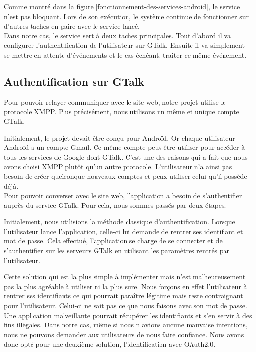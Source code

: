 Comme montré dans la figure \ref{fonctionnement-des-services-android}, le service n'est pas  bloquant. 
Lors de son exécution, le système continue de fonctionner sur d'autres taches en paire avec le service lancé.
\\

Dans notre cas, le service sert à deux taches principales. Tout d'abord il va configurer l'authentification
de l'utilisateur sur GTalk. Ensuite il va simplement se mettre en attente d'événements et le cas échéant, 
traiter ce même événement.
\\



\subsection{Authentification sur GTalk}

Pour pouvoir relayer communiquer avec le site web, notre projet utilise le protocole XMPP. Plus 
précisément, nous utilisons un même et unique compte GTalk. 

Initialement, le projet devait être conçu pour Androïd. Or chaque utilisateur Androïd a un compte 
Gmail. Ce même compte peut être utiliser pour accéder à tous les services de Google dont GTalk.
C'est une des raisons qui a fait que nous avons choisi XMPP plutôt qu'un autre protocole. L'utilisateur
n'a ainsi pas besoin de créer quelconque nouveaux comptes et peux utiliser celui qu'il possède déjà.
\\


Pour pouvoir converser avec le site web, l'application a besoin de s'authentifier auprès du service
GTalk. Pour cela, nous sommes passés par deux étapes. 

Initialement, nous utilisions la méthode classique d'authentification. Lorsque l'utilisateur lance 
l'application, celle-ci lui demande de rentrer ses identifiant et mot de passe. Cela effectué, 
l'application se charge de se connecter et de s'authentifier sur les serveurs GTalk en utilisant les
paramètres rentrés par l'utilisateur.

Cette solution qui est la plus simple à implémenter mais n'est malheureusement pas la plus agréable
à utiliser ni la plus sure. Nous forçons en effet l'utilisateur à rentrer ses identifiants ce qui 
pourrait paraître légitime mais reste contraignant pour l'utilisateur. Celui-ci ne sait pas ce que 
nous faisons avec son mot de passe. Une application malveillante pourrait récupérer les identifiants
et s'en servir à des fins illégales. Dans notre cas, même si nous n'avions aucune mauvaise intentions,
nous ne pouvons demander aux utilisateurs de nous faire confiance. Nous avons donc opté pour une 
deuxième solution, l'identification avec OAuth2.0.

